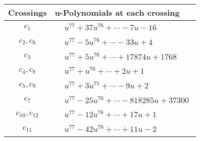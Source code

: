 \documentclass[1p]{elsarticle_modified}
\theoremstyle{definition}
\begin{document}
\begin{tabular}{m{50pt}|m{274pt}}
Crossings & \hspace{64pt}u-Polynomials at each crossing \\
\hline $$\begin{aligned}c_{1}\end{aligned}$$&$\begin{aligned}
&u^{77}+37 u^{76}+\cdots-7 u-16
\end{aligned}$\\
\hline $$\begin{aligned}c_{2},c_{6}\end{aligned}$$&$\begin{aligned}
&u^{77}-5 u^{76}+\cdots-33 u+4
\end{aligned}$\\
\hline $$\begin{aligned}c_{3}\end{aligned}$$&$\begin{aligned}
&u^{77}+5 u^{76}+\cdots+17874 u+1768
\end{aligned}$\\
\hline $$\begin{aligned}c_{4},c_{8}\end{aligned}$$&$\begin{aligned}
&u^{77}+u^{76}+\cdots+2 u+1
\end{aligned}$\\
\hline $$\begin{aligned}c_{5},c_{9}\end{aligned}$$&$\begin{aligned}
&u^{77}+3 u^{75}+\cdots-9 u+2
\end{aligned}$\\
\hline $$\begin{aligned}c_{7}\end{aligned}$$&$\begin{aligned}
&u^{77}-25 u^{76}+\cdots-818285 u+37300
\end{aligned}$\\
\hline $$\begin{aligned}c_{10},c_{12}\end{aligned}$$&$\begin{aligned}
&u^{77}-12 u^{76}+\cdots+17 u+1
\end{aligned}$\\
\hline $$\begin{aligned}c_{11}\end{aligned}$$&$\begin{aligned}
&u^{77}-42 u^{76}+\cdots+11 u-2
\end{aligned}$\\
\hline
\end{tabular}\\~\\
\end{document}
